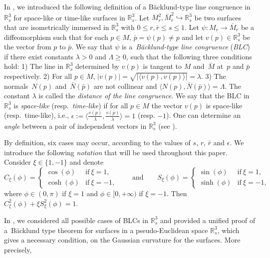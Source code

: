 \documentclass[pdftex]{sigma}
\numberwithin{equation}{section}
\begin{document}
In \cite{KRT2022}, we introduced the following definition of a B\"acklund-type line congruence in ${\mathbb{R}}^3_s$ for space-like or time-like surfaces in ${\mathbb{R}}^3_s$.
 Let $M^2_{r},\bar{M}^{2}_{\bar{r}}\hookrightarrow{\mathbb{R}}^3_{s}$ be two surfaces that are isometrically immersed in ${\mathbb{R}}_s^3$ with $0\leq r,\bar{r}\leq s\leq 1$.
Let $\psi\colon M_r\rightarrow \bar{M}_{\bar{r}}$ be a diffeomorphism such that for each $p\in M$, $\bar{p}=\psi(p)\neq p$ and
let $v(p)\in {\mathbb{R}}^3_s$ be the vector from $p$ to $\bar{p}$.
We say that $\psi$ is a~{\em B\"acklund-type line congruence} ({\em BLC})
 if there exist constants $\lambda>0$ and $\Lambda\geq 0$, such that
 the following three conditions hold:
 1) The line in ${\mathbb{R}}^3_s$ determined by $v(p)$ is tangent to $M$ and~$\bar{M}$ at~$p$ and $\bar{p}$
respectively.
2) For all $p\in M$, $|v(p)|=\sqrt{|\langle v(p),v(p)\rangle|}=\lambda$.
3) The normals~$N(p)$ and~$\bar{N}(\bar{p})$ are not collinear and $ \bigl\langle N(p),\bar{N}(\bar{p})\bigr\rangle=\Lambda$.
 The constant $\lambda$ is called the {\em distance of the line congruence}.
 We say that the BLC in ${\mathbb{R}}^3_s$ is {\em space-like} (resp.\ {\em time-like}) if for all $p\in M$ the vector $v(p)$ is space-like (resp.\ time-like), i.e., $\epsilon:=\big\langle \frac{v(p)}{\lambda}, \frac{v(p)}{\lambda}\big\rangle=1$ ({resp.} $-1$). One can determine an \textit{angle} between a pair of independent vectors in ${\mathbb{R}}^3_s$ (see \cite{KRT2022}).

 By definition, six cases may occur, according to the values of
 $s$, $r$, $\bar{r}$ and $\epsilon$. We introduce the following {\it notation} that will be used throughout this paper. Consider $\xi\in \{ 1,-1 \}$ and denote
\begin{equation}\label{eq:CS}
C_{\xi}(\phi)=
\begin{cases}
\cos(\phi)&\mbox{if} \ \xi=1,\\
\cosh(\phi)&\mbox{if} \ \xi=-1,
\end{cases}
\qquad \mbox{and}\qquad
S_{\xi}(\phi)=
\begin{cases}
\sin(\phi)&\mbox{if}\ \xi=1,\\
\sinh(\phi)&\mbox{if}\ \xi=-1,
\end{cases}
\end{equation}
where $\phi\in(0,\pi)$ if $\xi=1$ and $\phi\in[0,+\infty)$ if $\xi=-1$. Then $C_{\xi}^2(\phi)+ \xi S_{\xi}^2(\phi)=1$.


 In \cite{KRT2022}, we considered all possible cases of BLCs in ${\mathbb{R}}^3_s$ and provided a unified proof of a~B\"acklund type theorem for surfaces in a pseudo-Euclidean space ${\mathbb{R}}_s^3$, which gives a necessary condition, on the Gaussian curvature for the surfaces. More precisely,
\end{document}

